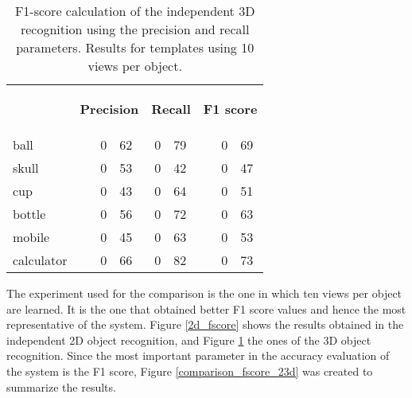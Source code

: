 \begin{table}[H]
\centering
\begin{tabular} {l l r@{.}l r@{.}l l r@{.}l }
\toprule
\addlinespace[3mm]
   \multicolumn{1}{c}{\begin{center}\textbf{Object}\end{center}} &
   \multicolumn{3}{c}{\begin{center}\textbf{Precision}\end{center}} &
   \multicolumn{2}{c}{\begin{center}\textbf{Recall}\end{center}} &
   \multicolumn{3}{c}{\begin{center}\hspace*{0.2cm}\textbf{F1 score}\end{center}} &\\
\addlinespace[-3mm]

\midrule
ball		&&	0&62 	&	0&79	&&	0&69	\\
skull		&&	0&53	&	0&42	&&	0&47	\\
cup			&&	0&43	&	0&64	&&	0&51	\\
bottle		&&	0&56	&	0&72	&&	0&63	\\
mobile		&&	0&45	&	0&63	&&	0&53	\\
calculator	&&	0&66	&	0&82	&&	0&73	\\

\bottomrule
\end{tabular}
\caption[F1-score - 3D recognition]{F1-score calculation of the independent 3D recognition using the precision and recall parameters. Results for templates using 10 views per object. }
\label{3d_fscore}
\end{table}

The experiment used for the comparison is the one in which ten views per object are learned. 
It is the one that obtained better F1 score values and hence the most representative of the system. 
Figure \ref{2d_fscore} shows the results obtained in the independent 2D object recognition, and Figure \ref{3d_fscore} the ones of the 3D object recognition. 
Since the most important parameter in the accuracy evaluation of the system is the F1 score, Figure \ref{comparison_fscore_23d} was created to summarize the results. 


